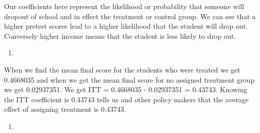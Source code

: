\documentclass[
  12pt,
  landscape]{article}
\begin{document}
Our coefficients here represent the likelihood or probability that
someone will dropout of school and in effect the treatment or control
group. We can see that a higher pretest scores lead to a higher
likelihood that the student will drop out. Conversely higher income
means that the student is less likely to drop out.

\begin{enumerate}
\def\labelenumi{(\alph{enumi})}
\setcounter{enumi}{20}
\item
\end{enumerate}

When we find the mean final score for the students who were treated we
get 0.4668035 and when we get the mean final score for no assigned
treatment group we get 0.02937351. We get ITT = 0.4668035 - 0.02937351 =
0.43743. Knowing the ITT coefficient is 0.43743 tells us and other
policy makers that the average effect of assigning treatment is 0.43743.

\begin{enumerate}
\def\labelenumi{(\alph{enumi})}
\setcounter{enumi}{21}
\item
\end{enumerate}
\end{document}
